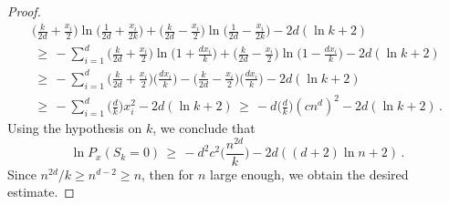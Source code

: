\documentclass[10pt]{amsart}
\theoremstyle{definition}\newtheorem{defi}[theo]{Definition}\newtheorem{rema}[theo]{Remark}\newtheorem{exam}[theo]{Example}\newtheorem{exem}[theo]{Example}\newtheorem{nota}[theo]{Notation}
\begin{document}
\begin{proof}
\begin{multline*}
\Big(\displaystyle \frac{k}{2d}+\frac{x_i}{2}\Big)\ln
\Big(\frac{1}{2d}+\frac{x_i}{2k}\Big)+
\Big(\displaystyle \frac{k}{2d}-\frac{x_i}{2}\Big)\ln
\Big(\frac{1}{2d}-\frac{x_i}{2k}\Big) -2d(\ln k+2)\\
\,\geq\, -\sum_{i=1}^d
\Big(\displaystyle \frac{k}{2d}+\frac{x_i}{2}\Big)\ln
\Big({1}+\frac{dx_i}{k}\Big)+
\Big(\displaystyle \frac{k}{2d}-\frac{x_i}{2}\Big)\ln
\Big({1}-\frac{dx_i}{k}\Big) -2d(\ln k+2)\\
\,\geq\, -\sum_{i=1}^d
\Big(\displaystyle \frac{k}{2d}+\frac{x_i}{2}\Big)
\Big(\frac{dx_i}{k}\Big)-
\Big(\displaystyle \frac{k}{2d}-\frac{x_i}{2}\Big)
\Big(\frac{dx_i}{k}\Big) -2d(\ln k+2)\\
\,\geq\, -\sum_{i=1}^d
\Big(\frac{d}{k}\Big)x_i^2 -2d(\ln k+2)
\,\geq\, -d
\Big(\frac{d}{k}\Big)(cn^d)^2 -2d(\ln k+2)\,.
\end{multline*}
Using the hypothesis on $k$, we conclude that
\[
\ln P_x(S_{k}=0)\,\geq\,
-d^2c^2
\Big(\frac{n^{2d}}{k}\Big) -2d((d+2)\ln n+2)\,.
\]
Since $n^{2d}/k\geq n^{d-2}\geq n$, then for $n$ large enough, we obtain the desired estimate.
\end{proof}
\end{document}
